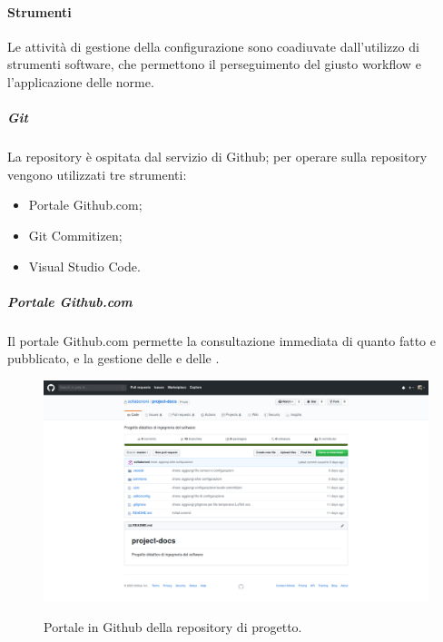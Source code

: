 \documentclass[../norme-di-progetto.tex]{subfiles}
\begin{document}
\paragraph{Strumenti}
Le attività di gestione della configurazione sono coadiuvate dall'utilizzo di strumenti software, che permettono il perseguimento del giusto workflow e l'applicazione delle norme.
\subparagraph{Git}
La repository è ospitata dal servizio di  Github; per operare sulla repository vengono utilizzati tre strumenti:
\begin{itemize}
  \item Portale Github.com;
  \item Git Commitizen;
  \item Visual Studio Code.
\end{itemize}
\subparagraph*{Portale Github.com}
Il portale Github.com permette la consultazione immediata di quanto fatto e pubblicato, e la gestione delle  e delle .
\begin{figure}[H]
  \centering
  \includegraphics[width=15cm]{img/github.png}
  \label{fig:github}
  \caption{Portale in Github della repository di progetto.}
\end{figure}
\end{document}
